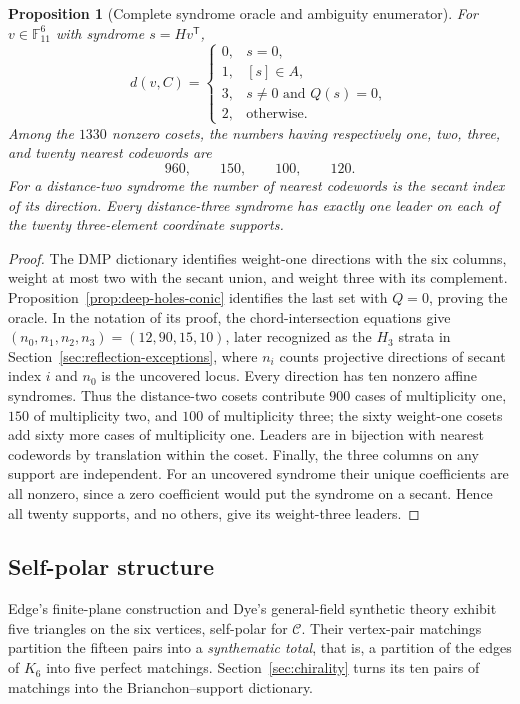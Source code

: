 \documentclass[11pt]{article}
\newtheorem{proposition}[theorem]{Proposition}
\theoremstyle{definition}
\theoremstyle{remark}
\newcommand{\F}{\mathbb{F}}
\newcommand{\cC}{\mathcal{C}}
\begin{document}
\begin{proposition}[Complete syndrome oracle and ambiguity enumerator]
\label{prop:decoding-oracle}
For $v\in\F_{11}^6$ with syndrome $s=Hv^{\mathsf T}$,
\[
 d(v,C)=
 \begin{cases}
 0,&s=0,\\
 1,&[s]\in A,\\
 3,&s\ne0\text{ and }Q(s)=0,\\
 2,&\text{otherwise}.
 \end{cases}
\]
Among the $1330$ nonzero cosets, the numbers having respectively one, two,
three, and twenty nearest codewords are
\[
 960,\qquad150,\qquad100,\qquad120.
\]
For a distance-two syndrome the number of nearest codewords is the secant
index of its direction. Every distance-three syndrome has exactly one
leader on each of the
twenty three-element coordinate supports.
\end{proposition}

\begin{proof}
The DMP dictionary identifies weight-one directions with the six columns,
weight at most two with the secant union, and weight three with its
complement.  Proposition~\ref{prop:deep-holes-conic} identifies the last
set with $Q=0$, proving the oracle.  In the notation of its proof, the
chord-intersection equations give
$(n_0,n_1,n_2,n_3)=(12,90,15,10)$, later recognized as the $H_3$
strata in Section~\ref{sec:reflection-exceptions}, where $n_i$ counts
projective directions of secant index $i$ and $n_0$ is the uncovered locus.
Every direction has
ten nonzero affine syndromes.  Thus the distance-two cosets contribute
$900$ cases of multiplicity one, $150$ of multiplicity two, and $100$ of
multiplicity three; the sixty weight-one cosets add sixty more cases of
multiplicity one.  Leaders are in bijection with nearest codewords by
translation within the coset.  Finally, the three columns on any support are independent.
For an uncovered syndrome their unique coefficients are all nonzero, since
a zero coefficient would put the syndrome on a secant.  Hence all twenty
supports, and no others, give its weight-three leaders.
\end{proof}

\subsection{Self-polar structure}
\label{sec:structural}

Edge's finite-plane construction
\cite[\S\S30.2--31]{Edge1956} and Dye's general-field synthetic theory
\cite[Theorem~2, pp.~277--278]{Dye1991} exhibit five triangles on the six
vertices, self-polar for $\cC$. Their vertex-pair matchings partition the
fifteen pairs into a \emph{synthematic total}, that is, a partition of the
edges of $K_6$ into five perfect matchings. Section~\ref{sec:chirality}
turns its ten pairs of matchings into the Brianchon--support dictionary.
\end{document}
